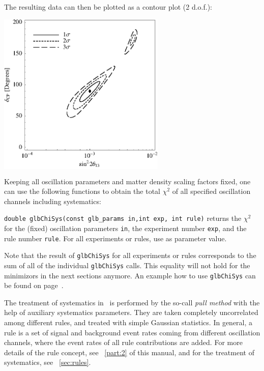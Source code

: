 {The resulting data can then be plotted as a contour plot (2 d.o.f.):
\begin{center}
\colorbox{white}{\includegraphics[width=8cm]{correx}}
\end{center}

}

Keeping all oscillation parameters and matter density scaling factors fixed,
 one can use the following functions to obtain the total $\chi^2$ of all 
 specified oscillation channels including systematics:
\begin{function} 
{\tt double glbChiSys(const glb\_params in,int exp, int rule)} returns
the $\chi^2$ for the (fixed) oscillation parameters {\tt in}, the
experiment number {\tt exp}, and the rule number {\tt rule}. For all
experiments or rules, use  as parameter value.
\end{function}
Note that the result of {\tt glbChiSys} for all experiments or rules
corresponds to the sum of all of the individual {\tt glbChiSys} calls. 
This equality will not hold for the minimizors in the next sections anymore. 
 An example how to use  {\tt glbChiSys} can be found on page~\pageref{ex:corrth13dcp}.  

The treatment of systematics in \GLOBES\ is performed by the so-call
{\em pull method} with the help of auxiliary systematics parameters.
They are taken completely uncorrelated among different rules, and treated with simple Gaussian statistics. In general, a rule is a set 
of signal and background event rates coming from different oscillation
channels, where the event rates of all rule contributions are added.
For more details of the rule concept, see \Part~\ref{part:2} of this manual,
and for the treatment of systematics, see \Sec~\ref{sec:rules}.
 
